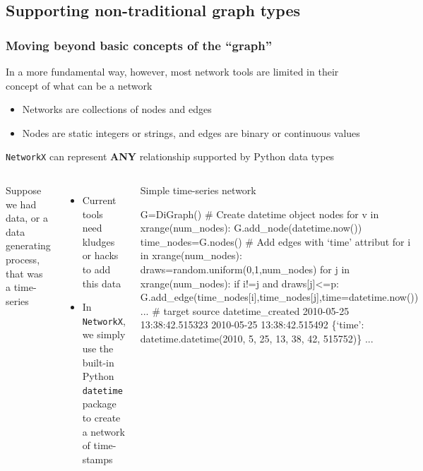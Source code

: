 \documentclass[xcolor=dvipsnames, 9pt]{beamer}
\newenvironment{code}{\begin{semiverbatim} \begin{footnotesize}}
{\end{footnotesize}\end{semiverbatim}}
\begin{document}

\subsection{Supporting non-traditional graph types} %
\label{sub:supporting_non_traditional_graph_types}

\begin{frame}[fragile]
    \frametitle{Moving beyond basic concepts of the ``graph''}
    In a more fundamental way, however, most network tools are limited in their concept of what can be a network
    \begin{itemize}
        \item Networks are collections of nodes and edges
        \item Nodes are static integers or strings, and edges are binary or continuous values
    \end{itemize}
    \texttt{NetworkX} can represent \textbf{ANY} relationship supported by Python data types
    \vspace{2mm}
    \begin{columns}
        \small{Suppose we had data, or a data generating process, that was a time-series
        \begin{itemize}
            \item Current tools need kludges or hacks to add this data
            \item In \texttt{NetworkX}, we simply use the built-in Python \texttt{datetime} package to create a network of time-stamps
        \end{itemize}}
        \begin{block}{\scriptsize{Simple time-series network}}
            \begin{code}
\tiny{G=DiGraph()
\alert<2>{# Create datetime object nodes
for v in xrange(num_nodes):
    G.add_node(datetime.now())
time_nodes=G.nodes()}
\alert<3>{# Add edges with `time' attribut
for i in xrange(num_nodes):
    draws=random.uniform(0,1,num_nodes)
    for j in xrange(num_nodes):
        if i!=j and draws[j]<=p:
            G.add_edge(time_nodes[i],time_nodes[j],time=datetime.now())
...}
\alert<4>{# target source datetime_created
2010-05-25 13:38:42.515323 2010-05-25 13:38:42.515492 
    \{`time': datetime.datetime(2010, 5, 25, 13, 38, 42, 515752)\}
...}}
                \end{code}
            \end{block}
    \end{columns}
\end{frame}
\end{document}
